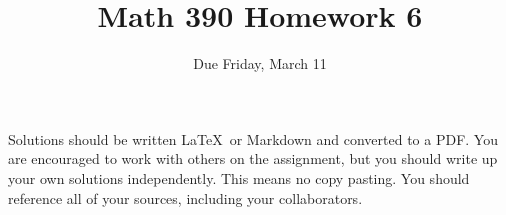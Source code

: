 \documentclass{article}
\title{Math 390 Homework 6}
\author{Due Friday, March 11}
\date{}
\begin{document}

\maketitle

\setlength{\parindent}{0em} %
\setlength{\parskip}{1em} %



Solutions should be written \LaTeX\ or Markdown and converted to a PDF. You are encouraged to work with others
on the assignment, but you should write up your own solutions independently. This means no copy pasting. You should
reference all of your sources, including your collaborators. 
\end{document}
